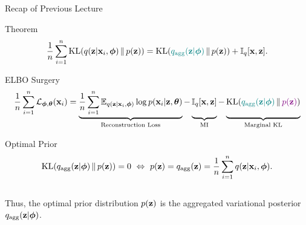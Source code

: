 \documentclass{beamer}
\begin{document}
\begin{frame}{Recap of Previous Lecture}
	\begin{block}{Theorem}
		\vspace{-0.6cm}
		\[
			\frac{1}{n} \sum_{i=1}^n \mathrm{KL}(q(\mathbf{z} | \mathbf{x}_i, \boldsymbol{\phi}) \,\|\, p(\mathbf{z})) = \mathrm{KL}({\color{teal}q_{\text{agg}}(\mathbf{z} | \boldsymbol{\phi}) } \,\|\, p(\mathbf{z})) + \mathbb{I}_{q} [\mathbf{x}, \mathbf{z}].
		\]
		\vspace{-0.6cm}
	\end{block}
	\begin{block}{ELBO Surgery}
		\vspace{-0.5cm}
		{\small
		\[		  
		    \frac{1}{n} \sum_{i=1}^n \cL_{\bphi, \btheta}(\bx_i) = \underbrace{\frac{1}{n} \sum_{i=1}^n \bbE_{q(\bz | \bx_i, \bphi)} \log p(\bx_i | \bz, \btheta)}_{\text{Reconstruction Loss}}
		    - \underbrace{\vphantom{\sum_{i=1}^n} \bbI_q [\bx, \bz]}_{\text{MI}} - \underbrace{\vphantom{\sum_{i=1}^n} \KL({\color{teal}q_{\text{agg}}(\bz | \bphi)} \,\|\, {\color{violet}p(\bz)})}_{\text{Marginal KL}}
		\]}
	\end{block}
	\vspace{-0.7cm}
	\begin{block}{Optimal Prior}
		\vspace{-0.7cm}
		\[
			\mathrm{KL}(q_{\text{agg}}(\mathbf{z} | \boldsymbol{\phi}) \,\|\, p(\mathbf{z})) = 0 \ \Leftrightarrow \ p (\mathbf{z}) = q_{\text{agg}}(\mathbf{z}) = \frac{1}{n} \sum_{i=1}^n q(\mathbf{z} | \mathbf{x}_i, \boldsymbol{\phi}).
		\]
		\vspace{-0.5cm}\\
		Thus, the optimal prior distribution $p(\mathbf{z})$ is the aggregated variational posterior $q_{\text{agg}}(\mathbf{z} | \boldsymbol{\phi})$.
	\end{block}
\end{frame}
\end{document}
